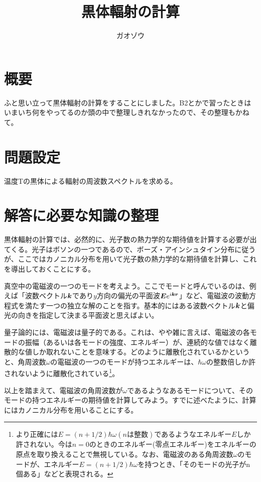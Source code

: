 \documentclass[uplatex,dvipdfmx]{jsarticle}
\title{黒体輻射の計算}
\author{ガオゾウ}
\begin{document}
\maketitle
\section{概要}
ふと思い立って黒体輻射の計算をすることにしました。B2とかで習ったときはいまいち何をやってるのか頭の中で整理しきれなかったので、その整理もかねて。

\section{問題設定}
温度Tの黒体による輻射の周波数スペクトルを求める。

\section{解答に必要な知識の整理}\label{sec:knowledge} 
黒体輻射の計算では、必然的に、光子数の熱力学的な期待値を計算する必要が出てくる。光子はボソンの一つであるので、ボーズ・アインシュタイン分布に従うが、ここではカノニカル分布を用いて光子数の熱力学的な期待値を計算し、これを導出しておくことにする。

\vspace{0.5cm}

真空中の電磁波の一つのモードを考えよう。ここでモードと呼んでいるのは、例えば「波数ベクトル$\vb*{k}$であり$y$方向の偏光の平面波$\vb*{E}e^{i\vb*{kr}}$」など、電磁波の波動方程式を満たす一つの独立な解のことを指す。基本的にはある波数ベクトル$\vb*{k}$と偏光の向きを指定して決まる平面波と思えばよい。

量子論的には、電磁波は量子的である。これは、やや雑に言えば、電磁波の各モードの振幅（あるいは各モードの強度、エネルギー）が、連続的な値ではなく離散的な値しか取れないことを意味する。どのように離散化されているかというと、角周波数$\omega$の電磁波の一つのモードが持つエネルギーは、$\hbar \omega$の整数倍しか許されないように離散化されている\footnote{より正確には$E=(n+1/2)\hbar\omega(nは整数)$であるようなエネルギー$E$しか許されない。今は$n=0$のときのエネルギー(零点エネルギー)をエネルギーの原点を取り換えることで無視している。なお、電磁波のある角周波数$\omega$のモードが、エネルギー$E=(n+1/2)\hbar\omega$を持つとき、「そのモードの光子がn個ある」などと表現される。}。

以上を踏まえて、電磁波の角周波数が$\omega$であるようなあるモードについて、そのモードの持つエネルギーの期待値を計算してみよう。すでに述べたように、計算にはカノニカル分布を用いることにする。
\end{document}

